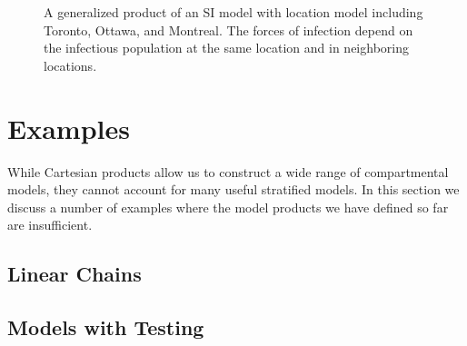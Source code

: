 \begin{figure}
    \centering
    
    \caption{A generalized product of an SI model with location model including Toronto, Ottawa, and Montreal. The forces of infection depend on the infectious population at the same location and in neighboring locations.}
    \label{fig:spat_g}
\end{figure}

\FloatBarrier


\section{Examples}\label{unco}

While Cartesian products allow us to construct a wide range of compartmental models, they cannot account for many useful stratified models. In this section we discuss a number of examples where the model products we have defined so far are insufficient.

\subsection{Linear Chains}\label{chains}


\subsection{Models with Testing}\label{testing}

